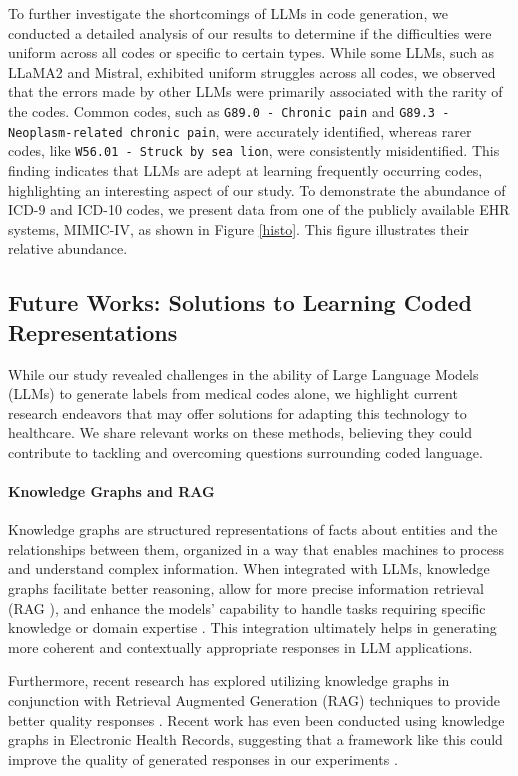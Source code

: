 \documentclass[11pt]{article}
\theoremstyle{plain}
\theoremstyle{definition}
\theoremstyle{remark}
\begin{document}
To further investigate the shortcomings of LLMs in code generation, we conducted a detailed analysis of our results to determine if the difficulties were uniform across all codes or specific to certain types. While some LLMs, such as LLaMA2 and Mistral, exhibited uniform struggles across all codes, we observed that the errors made by other LLMs were primarily associated with the rarity of the codes. Common codes, such as \texttt{G89.0 - Chronic pain} and \texttt{G89.3 - Neoplasm-related chronic pain}, were accurately identified, whereas rarer codes, like \texttt{W56.01 - Struck by sea lion}, were consistently misidentified. This finding indicates that LLMs are adept at learning frequently occurring codes, highlighting an interesting aspect of our study. To demonstrate the abundance of ICD-9 and ICD-10 codes, we present data from one of the publicly available EHR systems, MIMIC-IV, as shown in Figure \ref{histo}. This figure illustrates their relative abundance.

\subsection{Future Works: Solutions to Learning Coded Representations}

While our study revealed challenges in the ability of Large Language Models (LLMs) to generate labels from medical codes alone, we highlight current research endeavors that may offer solutions for adapting this technology to healthcare. We share relevant works on these methods, believing they could contribute to tackling and overcoming questions surrounding coded language.

\paragraph{Knowledge Graphs and RAG} Knowledge graphs are structured representations of facts about entities and the relationships between them, organized in a way that enables machines to process and understand complex information. When integrated with LLMs, knowledge graphs facilitate better reasoning, allow for more precise information retrieval (RAG \cite{lewis2020retrieval}), and enhance the models' capability to handle tasks requiring specific knowledge or domain expertise \cite{zhang2024raft}. This integration ultimately helps in generating more coherent and contextually appropriate responses in LLM applications.

Furthermore, recent research has explored utilizing knowledge graphs in conjunction with Retrieval Augmented Generation (RAG) techniques to provide better quality responses \cite{pan2024unifying, sanmartin2024kg, hussien2024rag}. Recent work has even been conducted using knowledge graphs in Electronic Health Records, suggesting that a framework like this could improve the quality of generated responses in our experiments \cite{zhu2024realm}.
\end{document}
